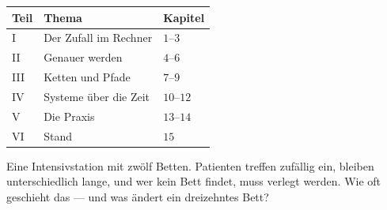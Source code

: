 \begin{merksatz}
\begin{center}
{\small
\renewcommand{\arraystretch}{1.5}
\begin{tabular}{@{}P{1.4cm}P{3.6cm}P{3.0cm}@{}}
\toprule
\textbf{Teil} & \textbf{Thema} & \textbf{Kapitel}\\
\midrule
I & Der Zufall im Rechner & $1$--$3$\\
II & Genauer werden & $4$--$6$\\
III & Ketten und Pfade & $7$--$9$\\
IV & Systeme über die Zeit & $10$--$12$\\
V & Die Praxis & $13$--$14$\\
VI & Stand & $15$\\
\bottomrule
\end{tabular}}
\end{center}

Eine Intensivstation mit zwölf Betten. Patienten treffen zufällig ein, bleiben unterschiedlich lange, und wer kein Bett findet, muss verlegt werden. Wie oft geschieht das --- und was ändert ein dreizehntes Bett?

\begin{center}
\begin{minipage}{0.88\textwidth}
\end{minipage}
\end{center}
\end{merksatz}

